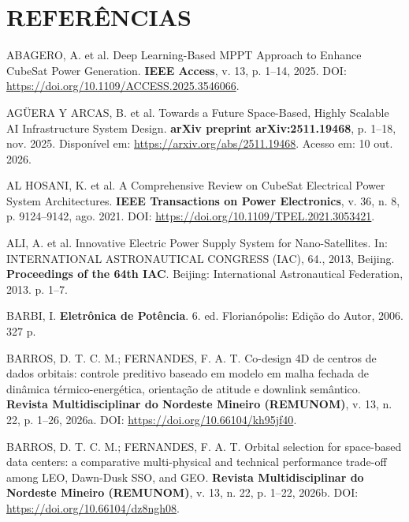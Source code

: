 \newpage
\section*{REFERÊNCIAS}

\begingroup
\singlespacing
\raggedright
\sloppy

\noindent ABAGERO, A. et al. Deep Learning-Based MPPT Approach to Enhance CubeSat Power Generation. \textbf{IEEE Access}, v. 13, p. 1--14, 2025. DOI: \url{https://doi.org/10.1109/ACCESS.2025.3546066}.

\vspace{0.2cm}
\noindent AGÜERA Y ARCAS, B. et al. Towards a Future Space-Based, Highly Scalable AI Infrastructure System Design. \textbf{arXiv preprint arXiv:2511.19468}, p. 1--18, nov. 2025. Disponível em: \url{https://arxiv.org/abs/2511.19468}. Acesso em: 10 out. 2026.

\vspace{0.2cm}
\noindent AL HOSANI, K. et al. A Comprehensive Review on CubeSat Electrical Power System Architectures. \textbf{IEEE Transactions on Power Electronics}, v. 36, n. 8, p. 9124--9142, ago. 2021. DOI: \url{https://doi.org/10.1109/TPEL.2021.3053421}.

\vspace{0.2cm}
\noindent ALI, A. et al. Innovative Electric Power Supply System for Nano-Satellites. In: INTERNATIONAL ASTRONAUTICAL CONGRESS (IAC), 64., 2013, Beijing. \textbf{Proceedings of the 64th IAC}. Beijing: International Astronautical Federation, 2013. p. 1--7.

\vspace{0.2cm}
\noindent BARBI, I. \textbf{Eletrônica de Potência}. 6. ed. Florianópolis: Edição do Autor, 2006. 327 p.

\vspace{0.2cm}
\noindent BARROS, D. T. C. M.; FERNANDES, F. A. T. Co-design 4D de centros de dados orbitais: controle preditivo baseado em modelo em malha fechada de dinâmica térmico-energética, orientação de atitude e downlink semântico. \textbf{Revista Multidisciplinar do Nordeste Mineiro (REMUNOM)}, v. 13, n. 22, p. 1--26, 2026a. DOI: \url{https://doi.org/10.66104/kh95jf40}.

\vspace{0.2cm}
\noindent BARROS, D. T. C. M.; FERNANDES, F. A. T. Orbital selection for space-based data centers: a comparative multi-physical and technical performance trade-off among LEO, Dawn-Dusk SSO, and GEO. \textbf{Revista Multidisciplinar do Nordeste Mineiro (REMUNOM)}, v. 13, n. 22, p. 1--22, 2026b. DOI: \url{https://doi.org/10.66104/dz8ngh08}.


